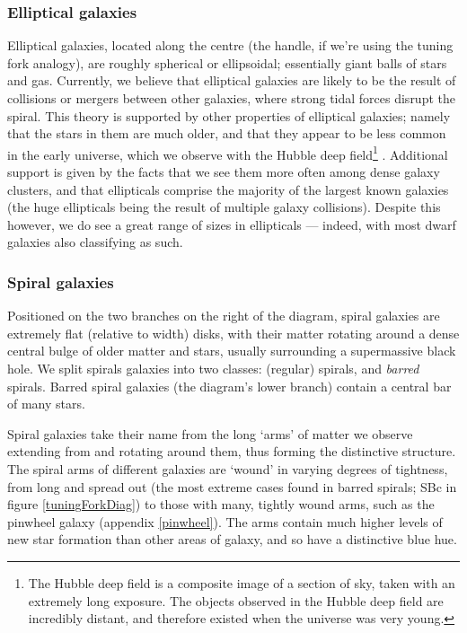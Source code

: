 \documentclass[11pt,a4paper]{article}
\begin{document}
\subsubsection{Elliptical galaxies}
Elliptical galaxies, located along the centre (the handle, if we're using the tuning fork analogy), are roughly spherical or ellipsoidal; essentially giant balls of stars and gas. Currently, we believe that elliptical galaxies are likely to be the result of collisions or mergers between other galaxies, where strong tidal forces disrupt the spiral. This theory is supported by other properties of elliptical galaxies; namely that the stars in them are much older, and that they appear to be less common in the early universe, which we observe with the Hubble deep field\footnote{The Hubble deep field is a composite image of a section of sky, taken with an extremely long exposure. The objects observed in the Hubble deep field are incredibly distant, and therefore existed when the universe was very young.} \cite{deepEliptical}. Additional support is given by the facts that we see them more often among dense galaxy clusters, and that ellipticals comprise the majority of the largest known galaxies (the huge ellipticals being the result of multiple galaxy collisions). Despite this however, we do see a great range of sizes in ellipticals --- indeed, with most dwarf galaxies also classifying as such. \cite{sloan}

 
\subsubsection{Spiral galaxies}
Positioned on the two branches on the right of the diagram, spiral galaxies are extremely flat (relative to width) disks, with their matter rotating around a dense central bulge of older matter and stars, usually surrounding a supermassive black hole. We split spirals galaxies into two classes: (regular) spirals, and \emph{barred} spirals. Barred spiral galaxies (the diagram's lower branch) contain a central bar of many stars.

Spiral galaxies take their name from the long `arms' of matter we observe extending from and rotating around them, thus forming the distinctive structure. The spiral arms of different galaxies are `wound' in varying degrees of tightness, from long and spread out (the most extreme cases found in barred spirals; SBc in figure \ref{tuningForkDiag}) to those with many, tightly wound arms, such as the pinwheel galaxy (appendix \ref{pinwheel}). The arms contain much higher levels of new star formation than other areas of galaxy, and so have a distinctive blue hue.
\end{document}
